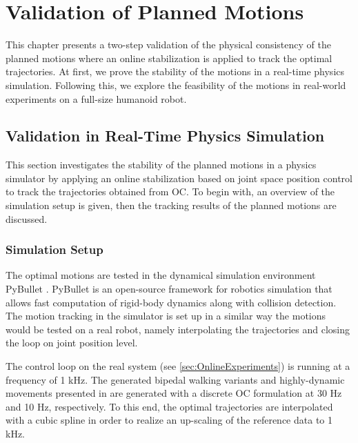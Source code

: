 
\chapter{Validation of Planned Motions}\label{c6}
This chapter presents a two-step validation of the physical consistency of the planned motions where an online stabilization is applied to track the optimal trajectories. At first, we prove the stability of the motions in a real-time physics simulation. Following this, we explore the feasibility of the motions in real-world experiments on a full-size humanoid robot.    

\section{Validation in Real-Time Physics Simulation}\label{sec:OnlineSimulation}
This section investigates the stability of the planned motions in a physics simulator by applying an online stabilization based on joint space position control to track the trajectories obtained from \gls{OC}. To begin with, an overview of the simulation setup is given, then the tracking results of the planned motions are discussed. 

\subsection{Simulation Setup}
The optimal motions are tested in the dynamical simulation environment PyBullet \cite{coumans2016pybullet}. PyBullet is an open-source framework for robotics simulation that allows fast computation of rigid-body dynamics along with collision detection. 
The motion tracking in the simulator is set up in a similar way the motions would be tested on a real robot, namely interpolating the trajectories and closing the loop on joint position level.

The control loop on the real system (see \cref{sec:OnlineExperiments}) is running at a frequency of 1 kHz. The generated bipedal walking variants and highly-dynamic movements presented in  are generated with a discrete \gls{OC} formulation at 30 \nolinebreak Hz and 10 Hz, respectively. To this end, the optimal trajectories are interpolated with a cubic spline in order to realize an up-scaling of the reference data to 1 kHz.  

